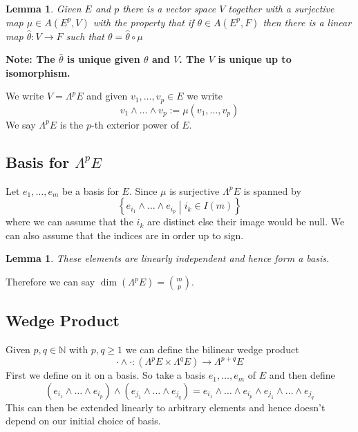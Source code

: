 \documentclass[11pt]{article}
\newcommand{\defeq}{:=}
\newcommand{\relmiddle}[1]{\mathrel{}\middle#1\mathrel{}}
\newcommand{\rmv}{\relmiddle|}
\newcommand{\N}{\mathbb{N}}
\newenvironment{defin}
	{\begin{mdframed}[backgroundcolor=white, roundcorner=5pt, linewidth=1pt, linecolor=Green]
		\setlength{\parindent}{0pt}}
	{\end{mdframed}}
\newcommand{\mdf}[1]{{\color{Green} #1}}
\newenvironment{note}
	{\begin{mdframed}[backgroundcolor=white, linecolor=red, roundcorner=5pt, linewidth=1pt]\bfseries{Note:}\normalfont
	\setlength{\parindent}{0pt}}
	{\end{mdframed}}
\newtheorem{lemma}[theorem]{Lemma}
\begin{document}
\begin{lemma}
Given $E$ and $p$ there is a vector space $V$ together with a surjective map $\mu\in A(E^p, V)$ with the property that if $\theta\in A(E^p, F)$ then there is a linear map $\hat{\theta}:V\to F$ such that $\theta = \hat{\theta}\circ\mu$
\end{lemma}

\begin{figure}[H]
	\centering
\end{figure}

\begin{note}
	The $\hat{\theta}$ is unique given $\theta$ and $V$.
	The $V$ is unique up to isomorphism.
\end{note}

\begin{defin}
We write $V = \Lambda^p E$ and given $v_1, \dots , v_p\in E$ we write
\[
	v_1 \wedge \dots \wedge v_p \defeq \mu(v_1, \dots ,v_p)
\]
We say $\Lambda^p E$ is the \mdf{$p$-th exterior power of $E$}.
\end{defin}

\subsection{Basis for $\Lambda^p E$}
Let $e_1, \dots , e_m$ be a basis for $E$.
Since $\mu$ is surjective $\Lambda^p E$ is spanned by
\[
	\left\{ e_{i_1} \wedge \dots \wedge e_{i_p} \rmv i_k\in I(m) \right\}
\]
where we can assume that the $i_k$ are distinct else their image would be null.
We can also assume that the indices are in order up to sign.

\begin{lemma}
These elements are linearly independent and hence form a basis.
\end{lemma}

Therefore we can say $\dim(\Lambda^p E) = \binom{m}{p}$.

\subsection{Wedge Product}
Given $p, q\in\N$ with $p, q \geq 1$ we can define the bilinear wedge product
\[
	\cdot \wedge \cdot : (\Lambda^p E \times \Lambda^q E) \to \Lambda^{p+q}E
\]
First we define on it on a basis.
So take a basis $e_1, \dots , e_m$ of $E$ and then define
\[
	(e_{i_1} \wedge \dots \wedge e_{i_p}) \wedge (e_{j_1} \wedge \dots \wedge e_{j_q}) = e_{i_1} \wedge \dots \wedge e_{i_p} \wedge e_{j_1} \wedge \dots \wedge e_{j_q}
\]
This can then be extended linearly to arbitrary elements and hence doesn't depend on our initial choice of basis.
\end{document}
